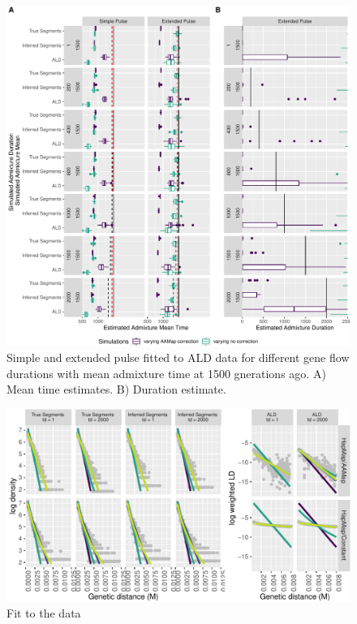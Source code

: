 \documentclass[11pt]{article}
\begin{document}
\begin{figure}
\centering
\includegraphics{ATE_Revisions_files/figure-latex/figResult3_1_Supplement-1.pdf}
\caption{\label{fig:figResult3_1_Supplement} Simple and extended pulse fitted to ALD data for different gene flow durations with mean admixture time at 1500 gnerations ago. A) Mean time estimates. B) Duration estimate.}
\end{figure}

\begin{figure}
\centering
\includegraphics{ATE_Revisions_files/figure-latex/figResult3_2_Supplements-1.pdf}
\caption{\label{fig:figResult3_2_Supplements} Fit to the data}
\end{figure}
\end{document}
